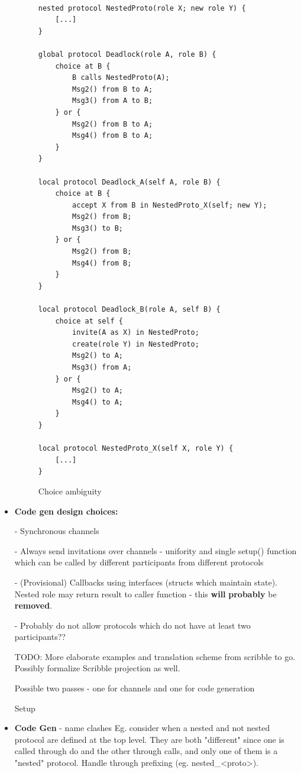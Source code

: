 \documentclass[12pt,twoside]{report}
\begin{document}
\begin{itemize}
\begin{figure}[h]
\centering
\lstset{language=Scribble}
\begin{lstlisting}

nested protocol NestedProto(role X; new role Y) {
    [...]
}

global protocol Deadlock(role A, role B) {
    choice at B {
        B calls NestedProto(A);
        Msg2() from B to A;
        Msg3() from A to B;
    } or {
        Msg2() from B to A;
        Msg4() from B to A;
    }
}

local protocol Deadlock_A(self A, role B) {
    choice at B {
        accept X from B in NestedProto_X(self; new Y);
        Msg2() from B;
        Msg3() to B;
    } or {
        Msg2() from B;
        Msg4() from B;
    }
}

local protocol Deadlock_B(role A, self B) {
    choice at self {
        invite(A as X) in NestedProto;
        create(role Y) in NestedProto;
        Msg2() to A;
        Msg3() from A;
    } or {
        Msg2() to A;
        Msg4() to A;
    }
}

local protocol NestedProto_X(self X, role Y) {
    [...]
}
    \end{lstlisting}
    \caption{Choice ambiguity}
    \label{deadlock}
\end{figure}{}

    \item \textbf{Code gen design choices:}
    
    - Synchronous channels
    
    - Always send invitations over channels - unifority and single setup() function which can be called by different participants from different protocols
    
    - (Provisional) Callbacks using interfaces (structs which maintain state). Nested role may return result to caller function - this \textbf{will} \textbf{probably} be \textbf{removed}.
    
    - Probably do not allow protocols which do not have at least two participants??
    
    TODO: More elaborate examples and translation scheme from scribble to go. Possibly formalize Scribble projection as well.
    
    Possible two passes - one for channels and one for code generation
    
    Setup 
    
    \item \textbf{Code Gen} - name clashes
    Eg. consider when a nested and not nested protocol are defined at the top level. They are both "different" since one is called through do and the other through calls, and only one of them is a "nested" protocol. Handle through prefixing (eg. nested\_<proto>).
    

\end{itemize}
\end{document}
